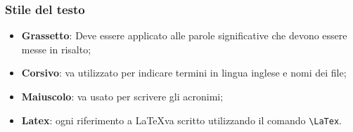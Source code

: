\documentclass[12pt,a4paper,titlepage]{article}
\begin{document}
\subsubsection{Stile del testo}
\begin{itemize}
\item \textbf{Grassetto}: Deve essere applicato alle parole significative che devono essere messe in risalto;
\item \textbf{Corsivo}: va utilizzato per indicare termini in lingua inglese e nomi dei file;
\item \textbf{Maiuscolo}: va usato per scrivere gli acronimi;
\item \textbf{Latex}: ogni riferimento a \LaTeX va scritto utilizzando il comando \verb|\LaTex|.
\end{itemize}
\end{document}
